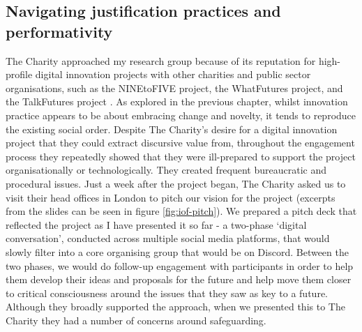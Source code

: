 \subsection{Navigating justification practices and performativity}
The Charity approached my research group because of its reputation for high-profile digital innovation projects with other charities and public sector organisations, such as the NINEtoFIVE project, the WhatFutures project, and the TalkFutures project \citep{lambton-howard_whatfutures:_2019, rainey_talkfutures_2020, abdulgalimov_designing_2020}. As explored in the previous chapter, whilst innovation practice appears to be about embracing change and novelty, it tends to reproduce the existing social order. Despite The Charity's desire for a digital innovation project that they could extract discursive value from, throughout the engagement process they repeatedly showed that they were ill-prepared to support the project organisationally or technologically. They created frequent bureaucratic and procedural issues. Just a week after the project began, The Charity asked us to visit their head offices in London to pitch our vision for the project (excerpts from the slides can be seen in figure \ref{fig:iof-pitch}). We prepared a pitch deck that reflected the project as I have presented it so far - a two-phase `digital conversation', conducted across multiple social media platforms, that would slowly filter into a core organising group that would be on Discord. Between the two phases, we would do follow-up engagement with participants in order to help them develop their ideas and proposals for the future and help move them closer to critical consciousness around the issues that they saw as key to a future. Although they broadly supported the approach, when we presented this to The Charity they had a number of concerns around safeguarding. 


